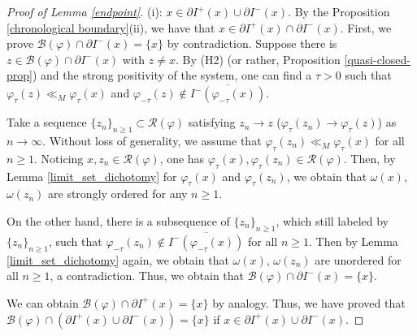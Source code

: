 \documentclass[a4paper,11pt]{article}
\theoremstyle{plain}
\theoremstyle{definition}
\numberwithin{equation}{section}
\begin{document}
	
	\begin{proof}[Proof of Lemma \ref{endpoint}]
    (i): $x\in \partial I^{+}(x)\cup \partial I^{-}(x)$. By the Proposition \ref{chronological boundary}(ii), we have that $x\in \partial I^{+}(x)\cap \partial I^{-}(x)$.
    First, we prove $\mathcal{B}(\varphi) \cap \partial  I^{-}(x) = \{x\}$ by contradiction. Suppose there is $z\in \mathcal{B}(\varphi)\cap \partial  I^{-}(x)$ with $z\neq x$. By \textnormal{(H2)} (or rather, Proposition \ref{quasi-closed-prop}) and the strong positivity of the system, one can find a $\tau>0$ such that $\varphi_{\tau}(z)\ll_M\varphi_{\tau}(x)$ and $\varphi_{-\tau}(z)\notin \overline{I^{-}(\varphi_{-\tau}(x))}$. 
		
	Take a sequence $\{z_n\}_{n\geq1} \subset \mathcal{R}(\varphi)$ satisfying $z_n \rightarrow z$ ($\varphi_{\tau}(z_n)\rightarrow\varphi_{\tau}(z)$) as $n\rightarrow \infty$.
	Without loss of generality, we assume that $\varphi_{\tau}(z_{n})\ll_M\varphi_{\tau}(x)$ for all $n\geq1$. 
	Noticing $x,z_n\in \mathcal{R}(\varphi)$, one has $\varphi_{\tau}(x), \varphi_{\tau}(z_n)\in \mathcal{R}(\varphi)$. Then, by Lemma \ref{limit_set_dichotomy} for $\varphi_{\tau}(x)$ and $\varphi_{\tau}(z_n)$, we obtain that $\omega(x)$, $\omega(z_n)$ are strongly ordered for any $n\geq1$.
		
	On the other hand, there is a subsequence of $\{z_n\}_{n\geq1}$, which still labeled by $\{z_n\}_{n\geq1}$, such that $\varphi_{-\tau}(z_n)\notin \overline{I^{-}(\varphi_{-\tau}(x))}$ for all $n\geq1$.
	Then by Lemma \ref{limit_set_dichotomy} again, we obtain that $\omega(x)$, $\omega(z_n)$ are unordered for all $n\geq1$, a contradiction. Thus, we obtain that $\mathcal{B}(\varphi) \cap \partial  I^{-}(x) = \{x\}$. 
    
    We can obtain $\mathcal{B}(\varphi) \cap \partial  I^{+}(x) = \{x\}$ by analogy. Thus, we have proved that $\mathcal{B}(\varphi)\cap (\partial  I^{+}(x)\cup \partial  I^{-}(x))=\{x\}$ if $x\in \partial I^{+}(x)\cup \partial I^{-}(x)$.
     

\end{proof}
\end{document}
